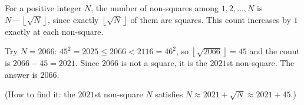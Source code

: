 For a positive integer $N$, the number of non-squares among $1,2,\dots,N$ is $N-\left\lfloor\sqrt N\right\rfloor$, since exactly $\left\lfloor\sqrt N\right\rfloor$ of them are squares. This count increases by $1$ exactly at each non-square.

Try $N=2066$: $45^2=2025\le2066<2116=46^2$, so $\left\lfloor\sqrt{2066}\right\rfloor=45$ and the count is $2066-45=2021$. Since $2066$ is not a square, it is the $2021$st non-square. The answer is $\boxed{2066}$.

(How to find it: the $2021$st non-square $N$ satisfies $N\approx2021+\sqrt N\approx2021+45$.)
